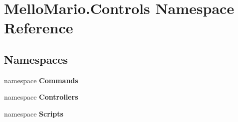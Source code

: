 \section{Mello\+Mario.\+Controls Namespace Reference}
\label{namespaceMelloMario_1_1Controls}
\subsection*{Namespaces}
\begin{DoxyCompactItemize}
\item 
namespace \textbf{ Commands}
\item 
namespace \textbf{ Controllers}
\item 
namespace \textbf{ Scripts}
\end{DoxyCompactItemize}
